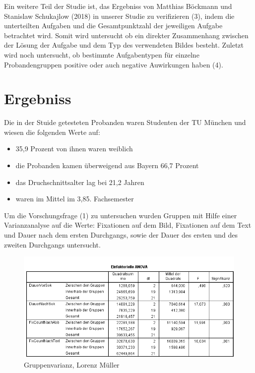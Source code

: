 Ein weitere Teil der Studie ist, das Ergebniss von Matthias Böckmann und Stanislaw Schukajlow (2018) in unserer Studie zu verifizieren (3), indem die unterteilten Aufgaben und die Gesamtpunktzahl der jeweiligen Aufgabe betrachtet wird. Somit wird untersucht ob ein direkter Zusammenhang zwischen der Lösung der Aufgabe und dem Typ des verwendeten Bildes besteht. Zuletzt wird noch untersucht, ob bestimmte Aufgabentypen für einzelne Probandengruppen positive oder auch negative Auwirkungen haben (4).

\chapter{Ergebniss}

Die in der Stuide getesteten Probanden waren Studenten der TU München und wiesen die folgenden Werte auf:

    \begin{itemize}
        \item 35,9 Prozent von ihnen waren weiblich 
        \item die Probanden kamen überweigend aus Bayern 66,7 Prozent
        \item das Druchschnittsalter lag bei 21,2 Jahren 
        \item waren im Mittel im 3,85. Fachsemester
    \end{itemize}

 Um die Vorschungsfrage (1) zu untersuchen wurden Gruppen mit Hilfe einer Varianzanalyse auf die Werte: Fixationen auf dem Bild, Fixationen auf dem Text und Dauer nach dem ersten Durchgangs, sowie der Dauer des ersten und des zweiten Durchgangs untersucht.


\begin{figure}[!ht]
\noindent\hspace{0.5mm}\includegraphics[width=15cm]{./Ressourcen/Gruppenunterscheidung.png}
\caption{Gruppenvarianz, Lorenz Müller}
\end{figure}


